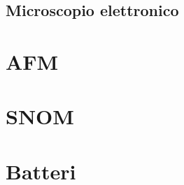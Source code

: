 \documentclass[../main.tex]{subfiles}
\begin{document}
\subsection{Microscopio elettronico}

\section{AFM}

\section{SNOM}

\section{Batteri}
\end{document}
